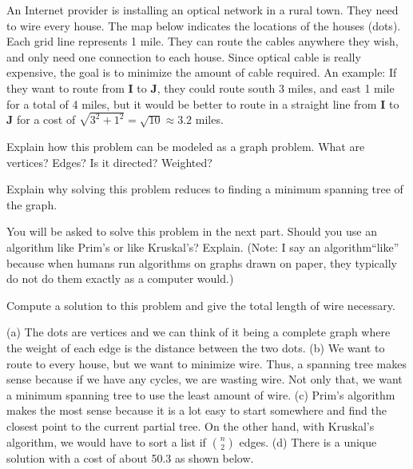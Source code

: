 \begin{requ}
An Internet provider is installing an optical network in a rural town.  
They need to wire every house. 
The map below indicates the locations of the houses (dots).
Each grid line represents 1 mile.
They can route the cables anywhere they wish, 
and only need one connection to each house.
Since optical cable is really expensive, 
the goal is to minimize the amount of cable required.
An example: 
If they want to route from {\bf I} to {\bf J}, they could route
south 3 miles, and east 1 mile for a total of 4 miles, 
but it would be better to route in 
a straight line from {\bf I} to {\bf J} for a cost of 
$\sqrt{3^2+1^2}=\sqrt{10}\approx 3.2$ miles.

\begin{lenum}
\item
Explain how this problem can be modeled as a graph problem.
What are vertices? Edges? Is it directed? Weighted?
\item
Explain why solving this problem reduces to finding a minimum
spanning tree of the graph.
\item 
You will be asked to solve this problem in the next part.
Should you use an algorithm like Prim's or like Kruskal's? 
Explain. (Note: I say an algorithm``like'' because when
humans run algorithms on graphs drawn on paper, they
typically do not do them exactly as a computer would.)
\item
Compute a solution to this problem and give the total
length of wire necessary.
\end{lenum}
\begin{requanswer}
(a) The dots are vertices and we can think of it being a complete
graph where the weight of each edge is the distance between
the two dots.
(b) We want to route to every house, but we want to minimize
wire. Thus, a spanning tree makes sense because if we have any 
cycles, we are wasting wire. Not only that, we want a minimum 
spanning tree to use the least amount of wire.
(c) Prim's algorithm makes the most sense because it is a lot
easy to start somewhere and find the closest point to the
current partial tree. On the other hand, with Kruskal's algorithm,
we would have to sort a list if $\binom{n}{2}$ edges.
(d) There is a unique solution with a cost of about 50.3 as shown below.

\end{requanswer}
\end{requ}

